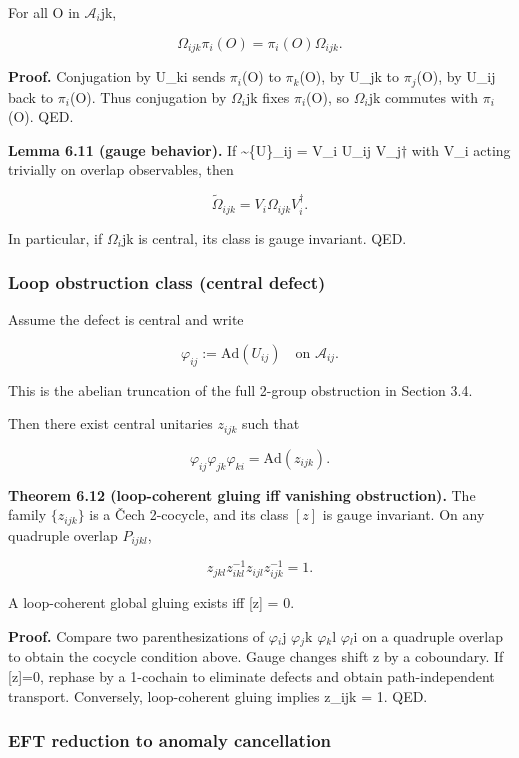 \documentclass[11pt,a4paper]{article}
\theoremstyle{remark}
\begin{document}
For all O in \(\mathcal{A}_i\)jk,

\[
\Omega_{ijk} \pi_i(O) = \pi_i(O) \Omega_{ijk}.
\]

\textbf{Proof.} Conjugation by U\_ki sends \(\pi_i\)(O) to \(\pi_k\)(O), by U\_jk to \(\pi_j\)(O),
by U\_ij back to \(\pi_i\)(O). Thus conjugation by \(\Omega{}_i\)jk fixes \(\pi_i\)(O), so
\(\Omega{}_i\)jk commutes with \(\pi_i\)(O). QED.

\textbf{Lemma 6.11 (gauge behavior).} If \textasciitilde\{U\}\_ij = V\_i U\_ij V\_j\ensuremath{\dagger} with V\_i
acting trivially on overlap observables, then

\[
\tilde{\Omega}_{ijk} = V_i \Omega_{ijk} V_i^\dagger.
\]

In particular, if \(\Omega{}_i\)jk is central, its class is gauge invariant. QED.

\subsubsection{Loop obstruction class (central defect)}\label{loop-obstruction-class-central-defect-1}

Assume the defect is central and write

\[
\varphi_{ij} := \mathrm{Ad}(U_{ij}) \quad \text{on } \mathcal{A}_{ij}.
\]

This is the abelian truncation of the full 2-group obstruction in Section 3.4.

Then there exist central unitaries \(z_{ijk}\) such that

\[
\varphi_{ij} \varphi_{jk} \varphi_{ki} = \mathrm{Ad}(z_{ijk}).
\]

\textbf{Theorem 6.12 (loop-coherent gluing iff vanishing obstruction).} The family
\(\{z_{ijk}\}\) is a \v{C}ech 2-cocycle, and its class \([z]\) is gauge invariant. On any
quadruple overlap \(P_{ijkl}\),

\[
z_{jkl} z_{ikl}^{-1} z_{ijl} z_{ijk}^{-1} = 1.
\]

A loop-coherent global gluing exists iff {[}z{]} = 0.

\textbf{Proof.} Compare two parenthesizations of
\(\varphi{}_i\)j \(\varphi{}_j\)k \(\varphi{}_k\)l \(\varphi{}_l\)i on a quadruple overlap to
obtain the cocycle condition above. Gauge changes shift z by a coboundary.
If {[}z{]}=0, rephase by a 1-cochain to eliminate defects and obtain
path-independent transport. Conversely, loop-coherent gluing implies
z\_ijk = 1. QED.

\subsubsection{EFT reduction to anomaly cancellation}\label{eft-reduction-to-anomaly-cancellation}
\end{document}
